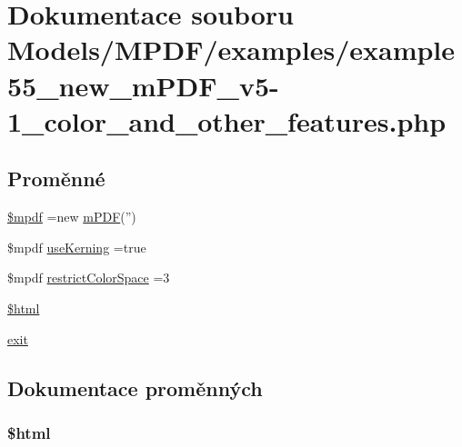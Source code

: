 \hypertarget{example55__new__m_p_d_f__v5-1__color__and__other__features_8php}{\section{Dokumentace souboru Models/\-M\-P\-D\-F/examples/example55\-\_\-new\-\_\-m\-P\-D\-F\-\_\-v5-\/1\-\_\-color\-\_\-and\-\_\-other\-\_\-features.php}
\label{example55__new__m_p_d_f__v5-1__color__and__other__features_8php}
}
\subsection*{Proměnné}
\begin{DoxyCompactItemize}
\item 
\hyperlink{example55__new__m_p_d_f__v5-1__color__and__other__features_8php_ad028f81910d6cbab9b184d2214b3a8f8}{\$mpdf} =new \hyperlink{classm_p_d_f}{m\-P\-D\-F}('')
\item 
\$mpdf \hyperlink{example55__new__m_p_d_f__v5-1__color__and__other__features_8php_aee7b0f8606c1b4849e0166a4a335069d}{use\-Kerning} =true
\item 
\$mpdf \hyperlink{example55__new__m_p_d_f__v5-1__color__and__other__features_8php_ace17057950eda2558dd7cc2c539d2df4}{restrict\-Color\-Space} =3
\item 
\hyperlink{example55__new__m_p_d_f__v5-1__color__and__other__features_8php_a6f96e7fc92441776c9d1cd3386663b40}{\$html}
\item 
\hyperlink{example55__new__m_p_d_f__v5-1__color__and__other__features_8php_a6733eb5f605d09eaede9845835d71c4e}{exit}
\end{DoxyCompactItemize}


\subsection{Dokumentace proměnných}
\hypertarget{example55__new__m_p_d_f__v5-1__color__and__other__features_8php_a6f96e7fc92441776c9d1cd3386663b40}{
\subsubsection[{\$html}]{\setlength{\rightskip}{0pt plus 5cm}\$html}}\label{example55__new__m_p_d_f__v5-1__color__and__other__features_8php_a6f96e7fc92441776c9d1cd3386663b40}


